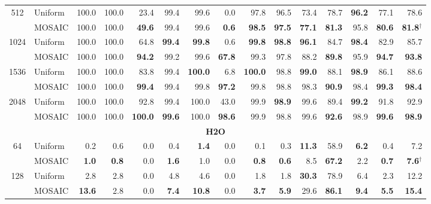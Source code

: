 \begin{table}[tp]
\begin{tabular}{@{} c l rrrrrrrrrrrrr @{}}
    \multirow{2}{*}{512} & Uniform & 100.0 & 100.0 & 23.4 & 99.4 & 99.6 & 0.0 & 97.8 & 96.5 & 73.4 & 78.7 & \textbf{96.2} & 77.1 & 78.6 \\
     & MOSAIC & 100.0 & 100.0 & \textbf{49.6} & 99.4 & 99.6 & \textbf{0.6} & \textbf{98.5} & \textbf{97.5} & \textbf{77.1} & \textbf{81.3} & 95.8 & \textbf{80.6} & \textbf{81.8}$^\dagger$ \\
    \cmidrule(l){1-15}
    \multirow{2}{*}{1024} & Uniform & 100.0 & 100.0 & 64.8 & \textbf{99.4} & \textbf{99.8} & 0.6 & \textbf{99.8} & \textbf{98.8} & \textbf{96.1} & 84.7 & \textbf{98.4} & 82.9 & 85.7 \\
     & MOSAIC & 100.0 & 100.0 & \textbf{94.2} & 99.2 & 99.6 & \textbf{67.8} & 99.3 & 97.8 & 88.2 & \textbf{89.8} & 95.9 & \textbf{94.7} & \textbf{93.8} \\
    \cmidrule(l){1-15}
    \multirow{2}{*}{1536} & Uniform & 100.0 & 100.0 & 83.8 & 99.4 & \textbf{100.0} & 6.8 & \textbf{100.0} & 98.8 & \textbf{99.0} & 88.1 & \textbf{98.9} & 86.1 & 88.6 \\
     & MOSAIC & 100.0 & 100.0 & \textbf{99.4} & 99.4 & 99.8 & \textbf{97.2} & 99.8 & 98.8 & 98.3 & \textbf{90.9} & 98.4 & \textbf{99.3} & \textbf{98.4} \\
    \cmidrule(l){1-15}
    \multirow{2}{*}{2048} & Uniform & 100.0 & 100.0 & 92.8 & 99.4 & 100.0 & 43.0 & 99.9 & \textbf{98.9} & 99.6 & 89.4 & \textbf{99.2} & 91.8 & 92.9 \\
     & MOSAIC & 100.0 & 100.0 & \textbf{100.0} & \textbf{99.6} & 100.0 & \textbf{98.6} & 99.9 & 98.8 & 99.6 & \textbf{92.6} & 98.9 & \textbf{99.6} & \textbf{98.9} \\
    \midrule
    \multicolumn{15}{c}{\textbf{H2O}} \\
    \midrule
    \multirow{2}{*}{64} & Uniform & 0.2 & 0.6 & 0.0 & 0.4 & \textbf{1.4} & 0.0 & 0.1 & 0.3 & \textbf{11.3} & 58.9 & \textbf{6.2} & 0.4 & 7.2 \\
     & MOSAIC & \textbf{1.0} & \textbf{0.8} & 0.0 & \textbf{1.6} & 1.0 & 0.0 & \textbf{0.8} & \textbf{0.6} & 8.5 & \textbf{67.2} & 2.2 & \textbf{0.7} & \textbf{7.6}$^\dagger$ \\
    \cmidrule(l){1-15}
    \multirow{2}{*}{128} & Uniform & 2.8 & 2.8 & 0.0 & 4.8 & 4.6 & 0.0 & 1.8 & 1.8 & \textbf{30.3} & 78.9 & 6.4 & 2.3 & 12.2 \\
     & MOSAIC & \textbf{13.6} & 2.8 & 0.0 & \textbf{7.4} & \textbf{10.8} & 0.0 & \textbf{3.7} & \textbf{5.9} & 29.6 & \textbf{86.1} & \textbf{9.4} & \textbf{5.5} & \textbf{15.4} \\

\end{tabular}
\end{table}
